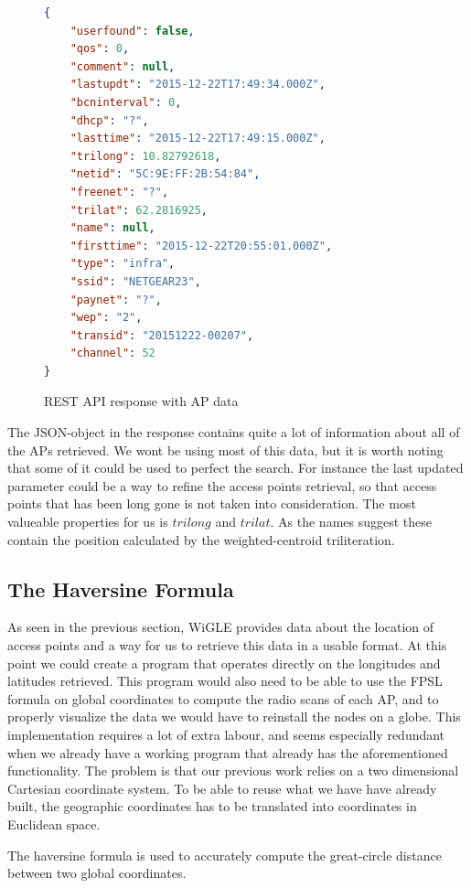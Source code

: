 	\begin{figure}[h]

	\begin{lstlisting}[language=json]
{
	"userfound": false,
	"qos": 0,
	"comment": null,
	"lastupdt": "2015-12-22T17:49:34.000Z",
	"bcninterval": 0,
	"dhcp": "?",
	"lasttime": "2015-12-22T17:49:15.000Z",
	"trilong": 10.82792618,
	"netid": "5C:9E:FF:2B:54:84",
	"freenet": "?",
	"trilat": 62.2816925,
	"name": null,
	"firsttime": "2015-12-22T20:55:01.000Z",
	"type": "infra",
	"ssid": "NETGEAR23",
	"paynet": "?",
	"wep": "2",
	"transid": "20151222-00207",
	"channel": 52
}

\end{lstlisting}
\caption{REST API response with AP data}
\label{fig:wigle}
\end{figure}

The JSON-object in the response contains quite a lot of information about all of the APs retrieved. We wont be using most of this data, but it is worth noting that some of it could be used to perfect the search. For instance the last updated parameter could
be a way to refine the access points retrieval, so that access points that has been long gone is not taken into consideration. The most valueable properties for us is $trilong$ and $trilat$. As the names suggest these contain the position calculated
by the weighted-centroid triliteration. 

\subsection{The Haversine Formula}
As seen in the previous section, WiGLE provides data about the location of access points and a way for us to retrieve this data in a usable format. 
At this point we could create a program that operates directly on the longitudes and latitudes retrieved.
This program would also need to be able to use the FPSL formula on global coordinates to compute the radio scans of each AP,
and to properly visualize the data we would have to reinstall the nodes on a globe. This implementation requires a lot of extra labour, and seems especially
redundant when we already have a working program that already has the aforementioned functionality.
The problem is that our previous work relies on a two dimensional Cartesian coordinate system.
To be able to reuse what we have have already built, the geographic coordinates has to be translated into coordinates in Euclidean space.

The haversine formula \cite{virtues} is used to accurately compute the great-circle distance between two global coordinates.

